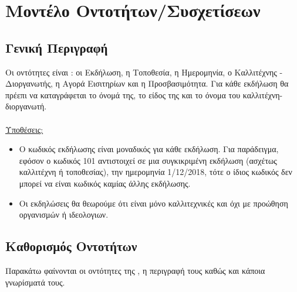 \section{Μοντέλο Οντοτήτων/Συσχετίσεων}

\subsection{Γενική Περιγραφή}

Οι οντότητες είναι : οι Εκδήλωση, η Τοποθεσία, η Ημερομηνία, ο Καλλιτέχνης - Διοργανωτής, η Αγορά Εισιτηρίων και η Προσβασιμότητα. Για κάθε εκδήλωση θα πρέεπι να καταγράφεται το όνομά της, το είδος της και το όνομα του καλλιτέχνη-διοργανωτή.
\\
\\
\underline{Υποθέσεις:}
\begin{itemize}[noitemsep]

\item Ο κωδικός εκδήλωσης είναι μοναδικός για κάθε εκδήλωση. Για παράδειγμα, εφόσον ο κωδικός 101 αντιστοιχεί σε μια συγκικριμένη εκδήλωση (ασχέτως καλλιτέχνη ή τοποθεσίας), την ημερομηνία 1/12/2018, τότε ο ίδιος κωδικός δεν μπορεί να είναι κωδικός καμίας άλλης εκδήλωσης.
\item Οι εκδηλώσεις θα θεωρούμε ότι είναι μόνο καλλιτεχνικές και όχι με προώθηση οργανισμών ή ιδεολογιων.


\end{itemize}

\subsection{Καθορισμός Οντοτήτων}

Παρακάτω φαίνονται οι οντότητες της \titlos, η περιγραφή τους καθώς και κάποια γνωρίσματά τους.

